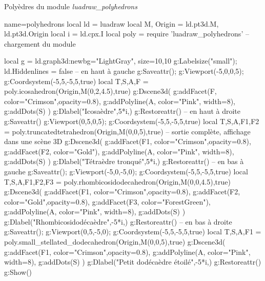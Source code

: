 \begin{demo}{Polyèdres du module \emph{luadraw\_polyhedrons}}
\begin{luadraw}{name=polyhedrons}
local ld = luadraw
local M, Origin = ld.pt3d.M, ld.pt3d.Origin
local i = ld.cpx.I
local poly = require 'luadraw_polyhedrons' -- chargement du module

local g = ld.graph3d:new{bg="LightGray", size={10,10}}
g:Labelsize("small"); ld.Hiddenlines = false
-- en haut à gauche 
g:Saveattr(); g:Viewport(-5,0,0,5); g:Coordsystem(-5,5,-5,5,true)
local T,S,A,F = poly.icosahedron(Origin,M(0,2,4.5),true) 
g:Dscene3d(
    g:addFacet(F, {color="Crimson",opacity=0.8}),
    g:addPolyline(A, {color="Pink", width=8}),
    g:addDots(S) )
g:Dlabel("Icosaèdre",5*i,{})
g:Restoreattr()
-- en haut à droite
g:Saveattr()
g:Viewport(0,5,0,5); g:Coordsystem(-5,5,-5,5,true)
local T,S,A,F1,F2 = poly.truncatedtetrahedron(Origin,M(0,0,5),true) -- sortie complète, affichage dans une scène 3D
g:Dscene3d(
    g:addFacet(F1, {color="Crimson",opacity=0.8}),
    g:addFacet(F2, {color="Gold"}),
    g:addPolyline(A, {color="Pink", width=8}),
    g:addDots(S) )
g:Dlabel("Tétraèdre tronqué",5*i,{})
g:Restoreattr()
-- en bas à gauche
g:Saveattr(); g:Viewport(-5,0,-5,0); g:Coordsystem(-5,5,-5,5,true)
local T,S,A,F1,F2,F3 = poly.rhombicosidodecahedron(Origin,M(0,0,4.5),true)
g:Dscene3d(
    g:addFacet(F1, {color="Crimson",opacity=0.8}),
    g:addFacet(F2, {color="Gold",opacity=0.8}), g:addFacet(F3, {color="ForestGreen"}),
    g:addPolyline(A, {color="Pink", width=8}), g:addDots(S) )
g:Dlabel("Rhombicosidodécaèdre",-5*i,{})
g:Restoreattr()
-- en bas à droite
g:Saveattr(); g:Viewport(0,5,-5,0); g:Coordsystem(-5,5,-5,5,true)
local T,S,A,F1 = poly.small_stellated_dodecahedron(Origin,M(0,0,5),true)
g:Dscene3d(
    g:addFacet(F1, {color="Crimson",opacity=0.8}),
    g:addPolyline(A, {color="Pink", width=8}),
    g:addDots(S) )
g:Dlabel("Petit dodécaèdre étoilé",-5*i,{})
g:Restoreattr()
g:Show()
\end{luadraw}
\end{demo}
